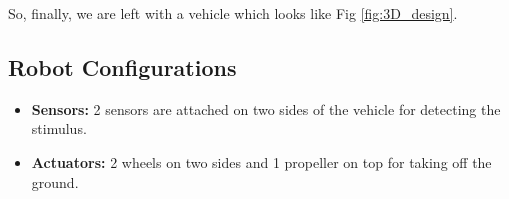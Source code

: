 \documentclass[main.tex]{subfiles}
\begin{document}
    So, finally, we are left with a vehicle which looks like Fig \ref{fig:3D_design}.
    \vspace{3mm}

    \subsection{Robot Configurations}
    \begin{itemize}
        \item \textbf{Sensors:} 2 sensors are attached on two sides of the vehicle for detecting the stimulus.
        \item \textbf{Actuators:} 2 wheels on two sides and 1 propeller on top for taking off the ground.
    \end{itemize}
\end{document}
